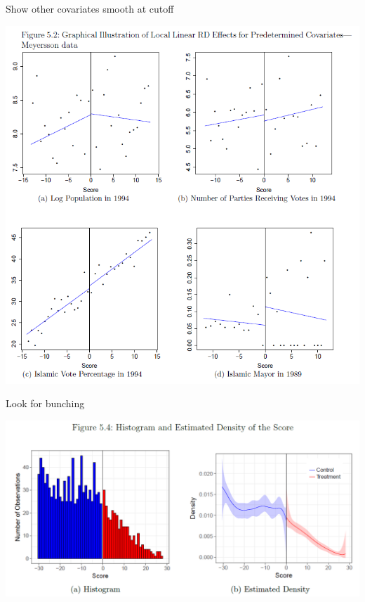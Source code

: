 \begin{frame}{Show other covariates smooth at cutoff}
  \begin{center}
  \includegraphics[width=\textwidth]{./resources/CatteneoPredetermined}
  \end{center}
\end{frame}

\begin{frame}{Look for bunching}
  \begin{center}
  \includegraphics[width=\textwidth]{./resources/CatteneoHistogram}
  \end{center}
\end{frame}


